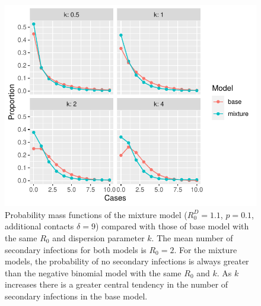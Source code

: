 \documentclass{imammb}
\numberwithin{equation}{section}
\begin{document}

\begin{figure}[!t] %
\centering\includegraphics {Figure1.pdf}
\caption{Probability mass functions of the mixture model ($R_0^D=1.1$, $p=0.1$, additional contacts $\delta =9$) compared with those of base model with the same $R_0$ and dispersion parameter $k$. The mean number of secondary infections for both models is $R_0 =2$. For the mixture models, the probability of no secondary infections is always greater than the negative binomial model with the same $R_0$ and $k$. As $k$ increases there is a greater central tendency in the number of secondary infections in the base model.  }
\label{approxeig}\vspace*{-9pt}
\end{figure}
\end{document}
